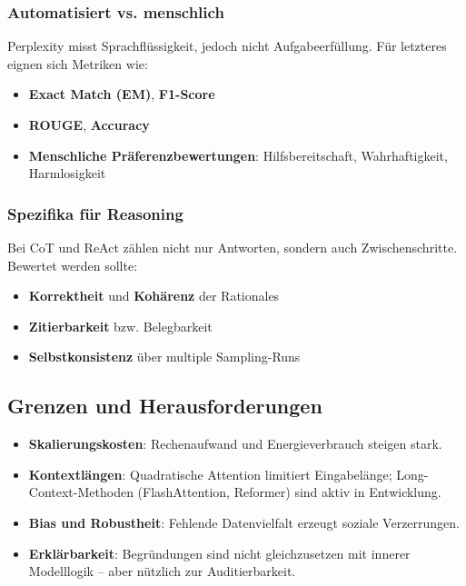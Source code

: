 \subsubsection{Automatisiert vs. menschlich}

Perplexity misst Sprachflüssigkeit, jedoch nicht Aufgabeerfüllung. Für letzteres eignen sich Metriken wie:

\begin{itemize}
    \item \textbf{Exact Match (EM)}, \textbf{F1-Score}
    \item \textbf{ROUGE}, \textbf{Accuracy}
    \item \textbf{Menschliche Präferenzbewertungen}: Hilfsbereitschaft, Wahrhaftigkeit, Harmlosigkeit
\end{itemize}

\subsubsection{Spezifika für Reasoning}

Bei CoT und ReAct zählen nicht nur Antworten, sondern auch Zwischenschritte. Bewertet werden sollte:

\begin{itemize}
    \item \textbf{Korrektheit} und \textbf{Kohärenz} der Rationales
    \item \textbf{Zitierbarkeit} bzw. Belegbarkeit
    \item \textbf{Selbstkonsistenz} über multiple Sampling-Runs
\end{itemize}

\subsection{Grenzen und Herausforderungen}

\begin{itemize}
    \item \textbf{Skalierungskosten}: Rechenaufwand und Energieverbrauch steigen stark.
    \item \textbf{Kontextlängen}: Quadratische Attention limitiert Eingabelänge; Long-Context-Methoden (FlashAttention, Reformer) sind aktiv in Entwicklung.
    \item \textbf{Bias und Robustheit}: Fehlende Datenvielfalt erzeugt soziale Verzerrungen.
    \item \textbf{Erklärbarkeit}: Begründungen sind nicht gleichzusetzen mit innerer Modelllogik – aber nützlich zur Auditierbarkeit.
\end{itemize}

